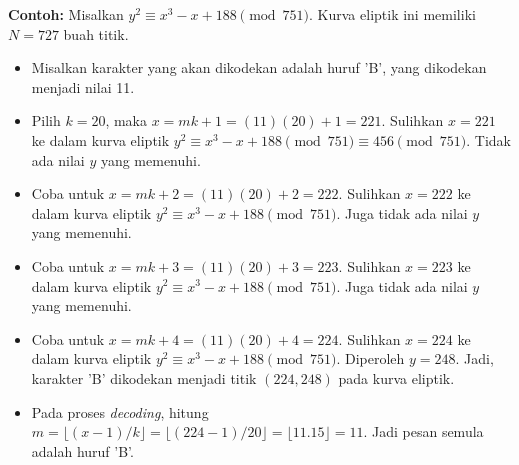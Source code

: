 \documentclass{article}
\begin{document}

\textbf{Contoh:} Misalkan $y^2 \equiv x^3 - x + 188 \pmod{751}$. Kurva eliptik ini memiliki $N = 727$ buah titik.

\begin{itemize}
    \item Misalkan karakter yang akan dikodekan adalah huruf 'B', yang dikodekan menjadi nilai 11.
    \item Pilih $k = 20$, maka $x = mk + 1 = (11)(20) + 1 = 221$. Sulihkan $x = 221$ ke dalam kurva eliptik $y^2 \equiv x^3 - x + 188 \pmod{751} \equiv 456 \pmod{751}$. Tidak ada nilai $y$ yang memenuhi.
    \item Coba untuk $x = mk + 2 = (11)(20) + 2 = 222$. Sulihkan $x = 222$ ke dalam kurva eliptik $y^2 \equiv x^3 - x + 188 \pmod{751}$. Juga tidak ada nilai $y$ yang memenuhi.
    \item Coba untuk $x = mk + 3 = (11)(20) + 3 = 223$. Sulihkan $x = 223$ ke dalam kurva eliptik $y^2 \equiv x^3 - x + 188 \pmod{751}$. Juga tidak ada nilai $y$ yang memenuhi.
    \item Coba untuk $x = mk + 4 = (11)(20) + 4 = 224$. Sulihkan $x = 224$ ke dalam kurva eliptik $y^2 \equiv x^3 - x + 188 \pmod{751}$. Diperoleh $y = 248$. Jadi, karakter 'B' dikodekan menjadi titik $(224, 248)$ pada kurva eliptik.
    \item Pada proses \textit{decoding}, hitung $m = \lfloor (x - 1)/k \rfloor = \lfloor (224 - 1)/20 \rfloor = \lfloor 11.15 \rfloor = 11$. Jadi pesan semula adalah huruf 'B'.
\end{itemize}
\end{document}
